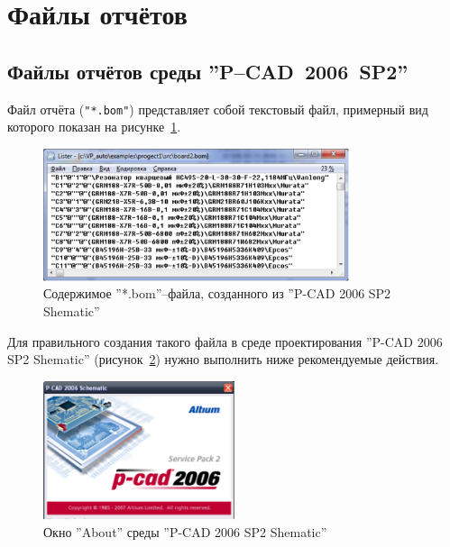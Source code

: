 \section{Файлы отчётов} \label{sec:reports} 
\subsection{Файлы отчётов среды ''P--CAD~2006~SP2''}
  Файл отчёта (\verb|"*.bom"|) представляет собой текстовый файл, примерный вид которого показан на рисунке~\ref{p:pic_pcad_low_bom_file}.

\begin{figure}[H]\center
  \includegraphics[width=0.8\textwidth]{VP_auto/pictures/pcad/pic_pcad_low_bom_file}
  \caption{Содержимое ''*.bom''--файла, созданного из ''P-CAD 2006 SP2 Shematic''} \label{p:pic_pcad_low_bom_file}
\end{figure}

Для правильного создания такого файла в среде проектирования ''P-CAD 2006 SP2 Shematic'' (рисунок~\ref{p:pic_about_shematic}) нужно выполнить ниже рекомендуемые действия.

\begin{figure}[H]\center
  \includegraphics[width=0.5\textwidth]{VP_auto/pictures/pic_about_shematic}
  \caption{Окно ''About'' среды ''P-CAD 2006 SP2 Shematic''} \label{p:pic_about_shematic}
\end{figure}

\newpage
